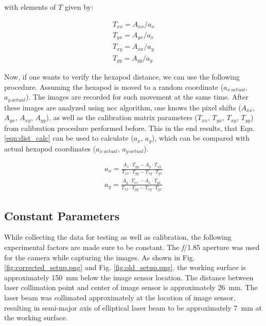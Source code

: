         \noindent with elements of $T$ given by:

        \begin{equation}\label{eqn:calib_matrix_param}
            \begin{aligned}
                T_{xx} = A_{xx} / a_x \\ 
                T_{yx} = A_{yx} / a_x \\
                T_{xy} = A_{xx} / a_y \\
                T_{yy} = A_{yy} / a_y 
            \end{aligned}
        \end{equation}

        \vspace{5mm}
        \noindent Now, if one wants to verify the hexapod distance, we can use the following procedure. Assuming the hexapod is moved to a random coordinate ($a_{x\ actual}$, $a_{y\ actual}$). The images are recorded for such movement at the same time. After these images are analyzed using \gls{ncc} algorithm, one knows the pixel shifts ($A_{xx}$, $A_{yx}$, $A_{xy}$, $A_{yy}$),  as well as the calibration matrix parameters ($T_{xx}$, $T_{yx}$, $T_{xy}$, $T_{yy}$) from calibration procedure performed before. This in the end results, that Eqn. \ref{eqn:dist_calc} can be used to calculate ($a_x$, $a_y$), which can be compared with actual hexapod coordinates ($a_{x\ actual}$, $a_{y\ actual}$). 

        \begin{equation}\label{eqn:dist_calc}
            \begin{aligned}
                a_x = \frac{A_x \cdot T_{yy} - A_y \cdot T_{xy}}{T_{xx} \cdot T_{yy} - T_{xy} \cdot T_{yx}} \\
                a_y = \frac{A_y \cdot T_{xx} - A_x \cdot T_{yx}}{T_{xx} \cdot T_{yy} - T_{xy} \cdot T_{yx}}
            \end{aligned}
        \end{equation}

\subsection{Constant Parameters}\label{section:constant_parameters}
    \noindent While collecting the data for testing as well as calibration, the following experimental factors are made sure to be constant. The \emph{f}/1.85 aperture was used for the camera while capturing the images. As shown in Fig. \ref{fig:corrected_setup.png} and Fig. \ref{fig:old_setup.png}, the working surface is approximately \SI{150}{\milli\meter} below the image sensor location. The distance between laser collimation point and center of image sensor is approximately \SI{26}{\milli\meter}. The laser beam was collimated approximately at the location of image sensor, resulting in semi-major axis of elliptical laser beam to be approximately \SI{7}{\milli\meter} at the working surface.
    
